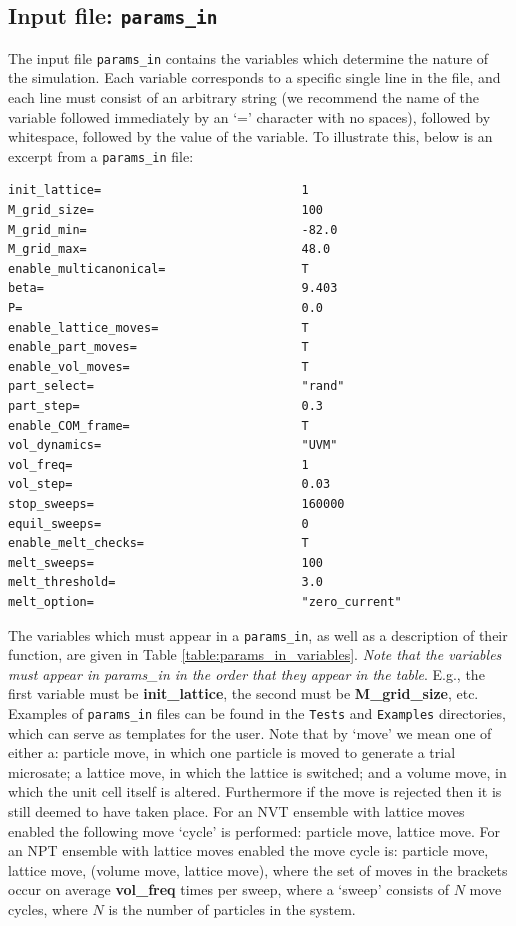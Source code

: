 \documentclass{report}
\begin{document}
\subsection{Input file: \texttt{params\_in}}\label{section:params_in}
The input file \texttt{params\_in} contains the variables which determine the nature of the simulation. Each variable corresponds to a
specific single line in the file, and each line must consist of an arbitrary string (we recommend the name of the variable followed immediately
by an `=' character with no spaces), followed by whitespace, followed by the value of the variable. To illustrate this, below is an excerpt from a 
\texttt{params\_in} file:
\begin{verbatim}
init_lattice=                            1
M_grid_size=                             100
M_grid_min=                              -82.0
M_grid_max=                              48.0
enable_multicanonical=                   T
beta=                                    9.403
P=                                       0.0
enable_lattice_moves=                    T
enable_part_moves=                       T
enable_vol_moves=                        T
part_select=                             "rand"
part_step=                               0.3
enable_COM_frame=                        T
vol_dynamics=                            "UVM"
vol_freq=                                1
vol_step=                                0.03
stop_sweeps=                             160000
equil_sweeps=                            0
enable_melt_checks=                      T
melt_sweeps=                             100
melt_threshold=                          3.0
melt_option=                             "zero_current"
\end{verbatim}
The variables which must appear in a \texttt{params\_in}, as well as a description of their function, are given in Table \ref{table:params_in_variables}. 
\emph{Note that the variables must appear in params\_in in the order that they appear in the table}. E.g., the first 
variable must be \textbf{init\_lattice}, the second must be \textbf{M\_grid\_size}, etc. Examples of \texttt{params\_in} files can
be found in the \texttt{Tests} and \texttt{Examples} directories, which can serve as templates for the user.
%
Note that by `move' we mean one of either a: particle move, in which one particle is moved to generate a trial microsate; a lattice move, in 
which the lattice is switched; and a volume move, in which the unit cell itself is altered. Furthermore if the move is rejected then it is 
still deemed to have taken place. For an NVT ensemble with lattice moves enabled the following move `cycle' is performed: particle move, 
lattice move. For an NPT ensemble with lattice moves enabled the move cycle is: particle move, lattice move, (volume move, lattice move), 
where the set of moves in the brackets occur on average \textbf{vol\_freq} times per sweep, where a `sweep' consists of $N$ move cycles,
where $N$ is the number of particles in the system.
\end{document}
